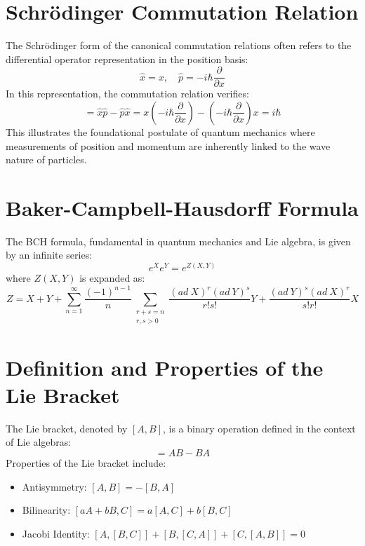 \documentclass{article}
\begin{document}
\section{Schrödinger Commutation Relation}
The Schrödinger form of the canonical commutation relations often refers to the differential operator representation in the position basis:
\begin{equation}
    \hat{x} = x, \quad \hat{p} = -i\hbar \frac{\partial}{\partial x}
\end{equation}
In this representation, the commutation relation verifies:
\begin{equation}
    [\hat{x}, \hat{p}] = \hat{x}\hat{p} - \hat{p}\hat{x} = x(-i\hbar \frac{\partial}{\partial x}) - (-i\hbar \frac{\partial}{\partial x})x = i\hbar
\end{equation}
This illustrates the foundational postulate of quantum mechanics where measurements of position and momentum are inherently linked to the wave nature of particles.

\section{Baker-Campbell-Hausdorff Formula}
The BCH formula, fundamental in quantum mechanics and Lie algebra, is given by an infinite series:
\begin{equation}
    e^X e^Y = e^{Z(X, Y)}
\end{equation}
where \(Z(X, Y)\) is expanded as:
\begin{equation}
    Z = X + Y + \sum_{n=1}^\infty \frac{(-1)^{n-1}}{n} \sum_{\substack{r+s=n \\ r,s>0}} \frac{(ad\ X)^r (ad\ Y)^s}{r! s!} Y + \frac{(ad\ Y)^s (ad\ X)^r}{s! r!} X
\end{equation}

\section{Definition and Properties of the Lie Bracket}
The Lie bracket, denoted by \([A, B]\), is a binary operation defined in the context of Lie algebras:
\begin{equation}
    [A, B] = AB - BA
\end{equation}
Properties of the Lie bracket include:
\begin{itemize}
    \item Antisymmetry: \([A, B] = -[B, A]\)
    \item Bilinearity: \([aA + bB, C] = a[A, C] + b[B, C]\)
    \item Jacobi Identity: \([A, [B, C]] + [B, [C, A]] + [C, [A, B]] = 0\)
\end{itemize}
\end{document}
